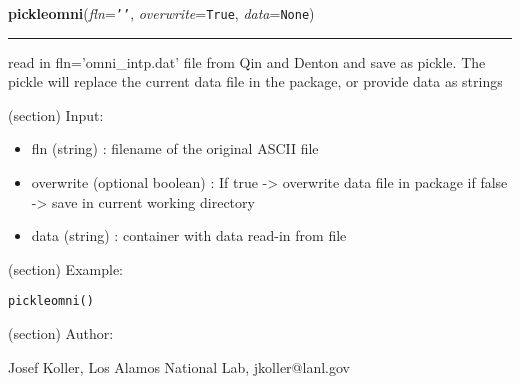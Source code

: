     \label{spacepy:omni:pickleomni}

    \vspace{0.5ex}

\hspace{.8\funcindent}\begin{boxedminipage}{\funcwidth}

    \raggedright \textbf{pickleomni}(\textit{fln}={\tt \texttt{'}\texttt{}\texttt{'}}, \textit{overwrite}={\tt True}, \textit{data}={\tt None})

    \vspace{-1.5ex}

    \rule{\textwidth}{0.5\fboxrule}
\setlength{\parskip}{2ex}
    read in fln='omni\_intp.dat'  file from Qin and Denton and save as 
    pickle. The pickle will replace the current data file in the package, 
    or provide data as strings

    (section) Input:

      \begin{itemize}
      \setlength{\parskip}{0.6ex}
        \item fln (string) : filename of the original ASCII file

        \item overwrite (optional boolean) : If true -{\textgreater} overwrite 
          data file in package if false -{\textgreater} save in current 
          working directory

        \item data (string) : container with data read-in from file

      \end{itemize}

    (section) Example:

\begin{alltt}
\pysrcprompt{{\textgreater}{\textgreater}{\textgreater} }pickleomni()\end{alltt}
    (section) Author:

      Josef Koller, Los Alamos National Lab, jkoller@lanl.gov

\setlength{\parskip}{1ex}
    \end{boxedminipage}

    \label{spacepy:omni:getG123}

